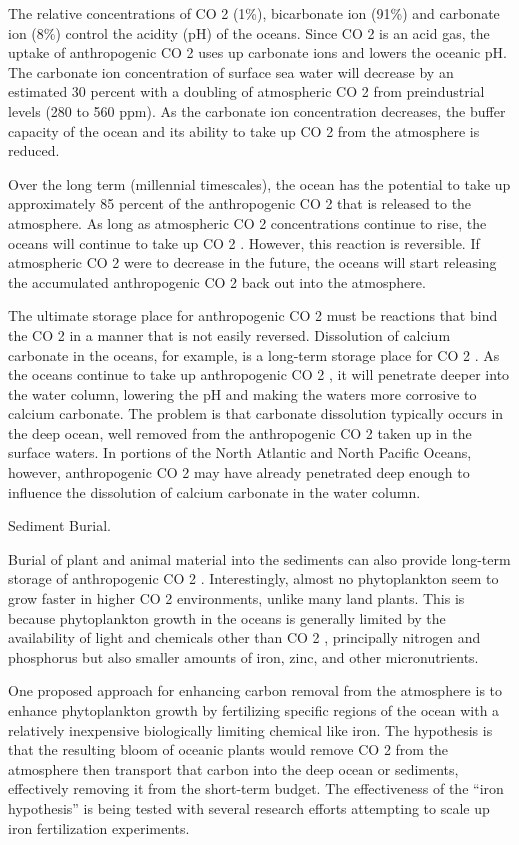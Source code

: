 \documentclass[
]{book}
\begin{document}
The relative concentrations of CO 2 (1\%), bicarbonate ion (91\%) and carbonate ion (8\%) control the acidity (pH) of the oceans. Since CO 2 is an acid gas, the uptake of anthropogenic CO 2 uses up carbonate ions and lowers the oceanic pH. The carbonate ion concentration of surface sea water will decrease by an estimated 30 percent with a doubling of atmospheric CO 2 from preindustrial levels (280 to 560 ppm). As the carbonate ion concentration decreases, the buffer capacity of the ocean and its ability to take up CO 2 from the atmosphere is reduced.

Over the long term (millennial timescales), the ocean has the potential to take up approximately 85 percent of the anthropogenic CO 2 that is released to the atmosphere. As long as atmospheric CO 2 concentrations continue to rise, the oceans will continue to take up CO 2 . However, this reaction is reversible. If atmospheric CO 2 were to decrease in the future, the oceans will start releasing the accumulated anthropogenic CO 2 back out into the atmosphere.

The ultimate storage place for anthropogenic CO 2 must be reactions that bind the CO 2 in a manner that is not easily reversed. Dissolution of calcium carbonate in the oceans, for example, is a long-term storage place for CO 2 . As the oceans continue to take up anthropogenic CO 2 , it will penetrate deeper into the water column, lowering the pH and making the waters more corrosive to calcium carbonate. The problem is that carbonate dissolution typically occurs in the deep ocean, well removed from the anthropogenic CO 2 taken up in the surface waters. In portions of the North Atlantic and North Pacific Oceans, however, anthropogenic CO 2 may have already penetrated deep enough to influence the dissolution of calcium carbonate in the water column.

Sediment Burial.

Burial of plant and animal material into the sediments can also provide long-term storage of anthropogenic CO 2 . Interestingly, almost no phytoplankton seem to grow faster in higher CO 2 environments, unlike many land plants. This is because phytoplankton growth in the oceans is generally limited by the availability of light and chemicals other than CO 2 , principally nitrogen and phosphorus but also smaller amounts of iron, zinc, and other micronutrients.

One proposed approach for enhancing carbon removal from the atmosphere is to enhance phytoplankton growth by fertilizing specific regions of the ocean with a relatively inexpensive biologically limiting chemical like iron. The hypothesis is that the resulting bloom of oceanic plants would remove CO 2 from the atmosphere then transport that carbon into the deep ocean or sediments, effectively removing it from the short-term budget. The effectiveness of the ``iron hypothesis'' is being tested with several research efforts attempting to scale up iron fertilization experiments.
\end{document}
